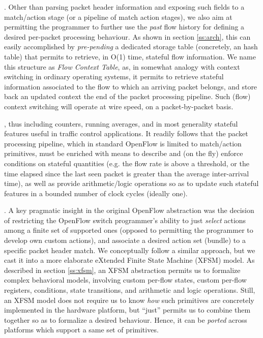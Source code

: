 \documentclass{sig-alternate}
\begin{document}
\vspace{3pt} . Other than parsing packet header information and exposing such fields to a match/action stage (or a pipeline of match action stages\cite{Bos13,flexpipe}), we also aim at permitting the programmer to further use the {\em past} flow history for defining a desired per-packet processing behaviour. As shown in section \ref{ss:arch}, this can easily accomplished by {\em pre-pending} a dedicated storage table (concretely, an hash table) that permits to retrieve, in O(1) time, stateful flow information. We name this structure as {\em Flow Context Table}, as, in somewhat analogy with context switching in ordinary operating systems, it permits to retrieve stateful information associated to the flow to which an arriving packet belongs, and store back an updated context the end of the packet processing pipeline. Such (flow) context switching will operate at wire speed, on a packet-by-packet basis. 

\vspace{3pt} , thus including counters, running averages, and in most generality stateful features useful in traffic control applications. It readily follows that the packet processing pipeline, which in standard OpenFlow is limited to match/action primitives, must be enriched with means to describe and (on the fly) enforce conditions on stateful quantities (e.g. the flow rate is above a threshold, or the time elapsed since the last seen packet is greater than the average inter-arrival time), as well as provide arithmetic/logic operations so as to update such stateful features in a bounded number of clock cycles (ideally one). 

\vspace{3pt} . A key pragmatic insight in the original OpenFlow abstraction was the decision of restricting the OpenFlow switch programmer's ability to just {\em select} actions among a finite set of supported ones (opposed to permitting the programmer to develop own custom actions), and associate a desired action set (bundle) to a specific packet header match. We conceptually follow a similar approach, but we cast it into a more elaborate eXtended Finite State Machine (XFSM) model. As described in section \ref{ss:xfsm}, an XFSM abstraction permits us to formalize complex behavioral models, involving custom per-flow states, custom per-flow registers, conditions, state transitions, and arithmetic and logic operations. Still, an XFSM model does not require us to know {\em how} such primitives are concretely implemented in the hardware platform, but ``just'' permits us to combine them together so as to formalize a desired behaviour. Hence, it can be {\em ported} across platforms which support a same set of primitives.
\end{document}
